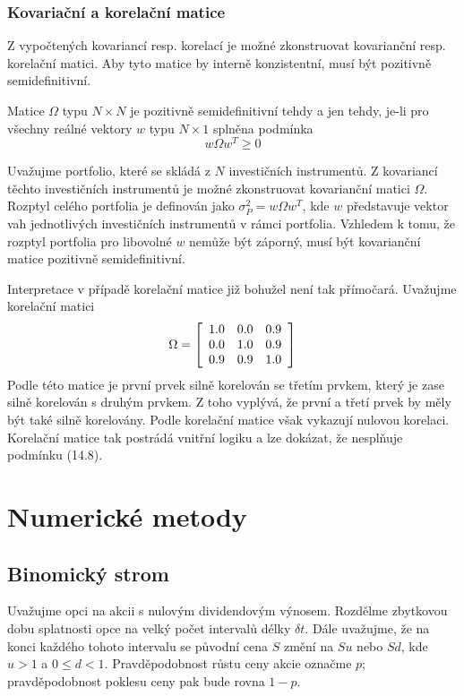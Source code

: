 \documentclass[a4paper]{book}
\begin{document}
\subsection{Kovariační a korelační matice}

Z vypočtených kovariancí resp. korelací je možné zkonstruovat kovarianční resp. korelační matici. Aby tyto matice by interně konzistentní, musí být pozitivně semidefinitivní.

Matice $\Omega$ typu $N \times N$ je pozitivně semidefinitivní tehdy a jen tehdy, je-li pro všechny reálné vektory $w$ typu $N \times 1$ splněna podmínka
\begin{equation}
w \Omega w^T \ge 0
\end{equation}

Uvažujme portfolio, které se skládá z $N$ investičních instrumentů. Z kovariancí těchto investičních instrumentů je možné zkonstruovat kovarianční matici $\Omega$. Rozptyl celého portfolia je definován jako $\sigma_P^2 = w \Omega w^T$, kde $w$ představuje vektor vah jednotlivých investičních instrumentů v rámci portfolia. Vzhledem k tomu, že rozptyl portfolia pro libovolné $w$ nemůže být záporný, musí být kovarianční matice pozitivně semidefinitivní.

Interpretace v případě korelační matice již bohužel není tak přímočará. Uvažujme korelační matici
\begin{equation*}
\Omega = \left[
{\begin{array}{c c c}
1.0 & 0.0 & 0.9\\
0.0 & 1.0 & 0.9\\
0.9 & 0.9 & 1.0\\
\end{array}}
\right]
\end{equation*}
Podle této matice je první prvek silně korelován se třetím prvkem, který je zase silně korelován s druhým prvkem. Z toho vyplývá, že první a třetí prvek by měly být také silně korelovány. Podle korelační matice však vykazují nulovou korelaci. Korelační matice tak postrádá vnitřní logiku a lze dokázat, že nesplňuje podmínku (14.8).

\chapter{Numerické metody}

\section{Binomický strom}
Uvažujme opci na akcii s nulovým dividendovým výnosem. Rozdělme zbytkovou dobu splatnosti opce na velký počet intervalů délky $\delta t$. Dále uvažujme, že na konci každého tohoto intervalu se původní cena $S$ změní na $Su$ nebo $Sd$, kde $u > 1$ a $  0 \le d < 1$. Pravděpodobnost růstu ceny akcie označme $p$; pravděpodobnost poklesu ceny pak bude rovna $1-p$. 
\end{document}
